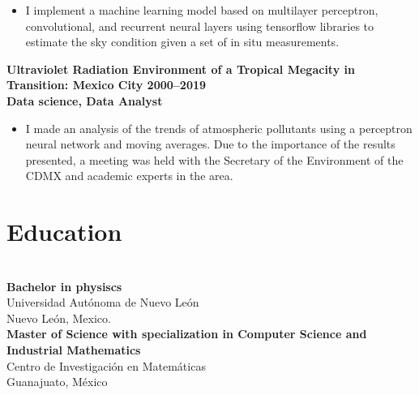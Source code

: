 \documentclass[a3paper]{adcv_color}
\newcommand{\proyect}[2]{
	\textbf{#2}\\
	{\color{linktext}	\textbf {#1}}
	\vspace{-1cm}\\
}
\begin{document}
\vspace{-0.1cm}
\begin{itemize}
	\setlength\itemsep{0em}
	\item I implement a machine learning model based on multilayer perceptron, convolutional, and recurrent neural layers using tensorflow libraries to estimate the sky condition given a set of in situ measurements.
\end{itemize}
\proyect{Data science, Data Analyst}{Ultraviolet Radiation Environment of a Tropical Megacity in Transition: Mexico City 2000–2019}
\begin{itemize}
	\setlength\itemsep{0em}
	\item I made an analysis of the trends of atmospheric pollutants using a perceptron neural network and moving averages. Due to the importance of the results presented, a meeting was held with the Secretary of the Environment of the CDMX and academic experts in the area.
\end{itemize}
\begin{minipage}{0.38\linewidth}
	\section{Education}\\

	\textbf{Bachelor in physiscs}\\
	Universidad Autónoma de Nuevo León\\
	Nuevo León, Mexico.\\

	\textbf{Master of Science with specialization in Computer Science and Industrial Mathematics}\\
	Centro de Investigación en Matemáticas\\
	Guanajuato, México
\end{minipage}
\end{document}
